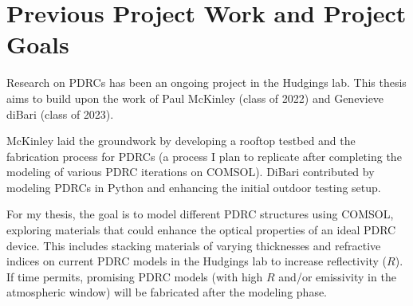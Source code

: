 




\section{Previous Project Work and Project Goals}
Research on PDRCs has been an ongoing project in the Hudgings lab. This thesis aims to build upon the work of Paul McKinley (class of 2022) and Genevieve diBari (class of 2023).

McKinley laid the groundwork by developing a rooftop testbed and the fabrication process for PDRCs (a process I plan to replicate after completing the modeling of various PDRC iterations on COMSOL). DiBari contributed by modeling PDRCs in Python and enhancing the initial outdoor testing setup.

For my thesis, the goal is to model different PDRC structures using COMSOL, exploring materials that could enhance the optical properties of an ideal PDRC device. This includes stacking materials of varying thicknesses and refractive indices on current PDRC models in the Hudgings lab to increase reflectivity ($R$). If time permits, promising PDRC models (with high $R$ and/or emissivity in the atmospheric window) will be fabricated after the modeling phase.
